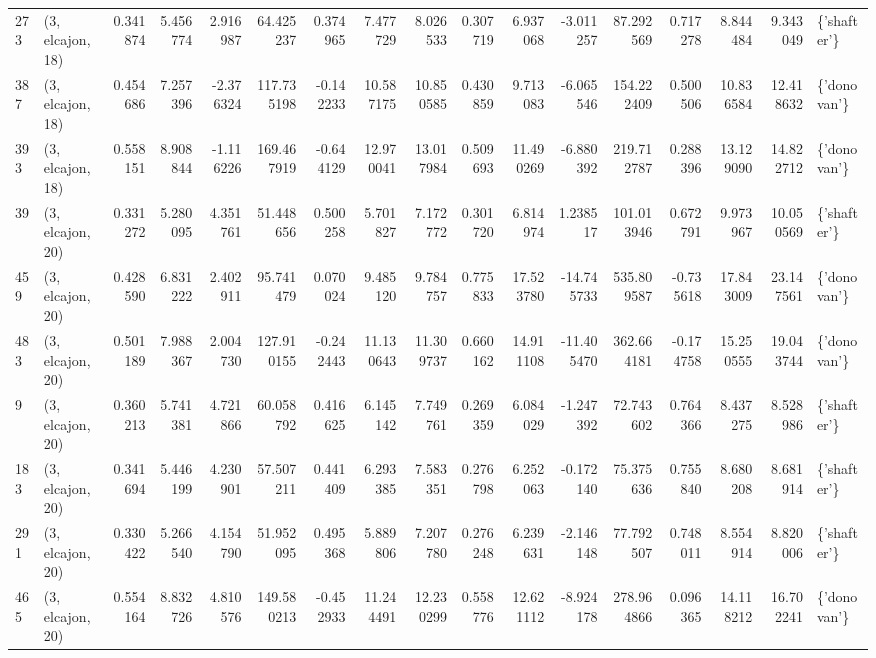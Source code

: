\begin{tabular}{llrrrrrrrrrrrrrrl}
273 &  (3, elcajon, 18) &   0.341874 &   5.456774 &   2.916987 &    64.425237 &   0.374965 &   7.477729 &   8.026533 &  0.307719 &   6.937068 &  -3.011257 &    87.292569 &   0.717278 &   8.844484 &   9.343049 &  \{'shafter'\} \\
387 &  (3, elcajon, 18) &   0.454686 &   7.257396 &  -2.376324 &   117.735198 &  -0.142233 &  10.587175 &  10.850585 &  0.430859 &   9.713083 &  -6.065546 &   154.222409 &   0.500506 &  10.836584 &  12.418632 &  \{'donovan'\} \\
393 &  (3, elcajon, 18) &   0.558151 &   8.908844 &  -1.116226 &   169.467919 &  -0.644129 &  12.970041 &  13.017984 &  0.509693 &  11.490269 &  -6.880392 &   219.712787 &   0.288396 &  13.129090 &  14.822712 &  \{'donovan'\} \\
39  &  (3, elcajon, 20) &   0.331272 &   5.280095 &   4.351761 &    51.448656 &   0.500258 &   5.701827 &   7.172772 &  0.301720 &   6.814974 &   1.238517 &   101.013946 &   0.672791 &   9.973967 &  10.050569 &  \{'shafter'\} \\
459 &  (3, elcajon, 20) &   0.428590 &   6.831222 &   2.402911 &    95.741479 &   0.070024 &   9.485120 &   9.784757 &  0.775833 &  17.523780 & -14.745733 &   535.809587 &  -0.735618 &  17.843009 &  23.147561 &  \{'donovan'\} \\
483 &  (3, elcajon, 20) &   0.501189 &   7.988367 &   2.004730 &   127.910155 &  -0.242443 &  11.130643 &  11.309737 &  0.660162 &  14.911108 & -11.405470 &   362.664181 &  -0.174758 &  15.250555 &  19.043744 &  \{'donovan'\} \\
9   &  (3, elcajon, 20) &   0.360213 &   5.741381 &   4.721866 &    60.058792 &   0.416625 &   6.145142 &   7.749761 &  0.269359 &   6.084029 &  -1.247392 &    72.743602 &   0.764366 &   8.437275 &   8.528986 &  \{'shafter'\} \\
183 &  (3, elcajon, 20) &   0.341694 &   5.446199 &   4.230901 &    57.507211 &   0.441409 &   6.293385 &   7.583351 &  0.276798 &   6.252063 &  -0.172140 &    75.375636 &   0.755840 &   8.680208 &   8.681914 &  \{'shafter'\} \\
291 &  (3, elcajon, 20) &   0.330422 &   5.266540 &   4.154790 &    51.952095 &   0.495368 &   5.889806 &   7.207780 &  0.276248 &   6.239631 &  -2.146148 &    77.792507 &   0.748011 &   8.554914 &   8.820006 &  \{'shafter'\} \\
465 &  (3, elcajon, 20) &   0.554164 &   8.832726 &   4.810576 &   149.580213 &  -0.452933 &  11.244491 &  12.230299 &  0.558776 &  12.621112 &  -8.924178 &   278.964866 &   0.096365 &  14.118212 &  16.702241 &  \{'donovan'\} \\

\end{tabular}
